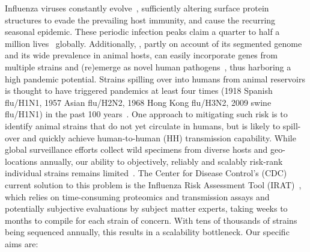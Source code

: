 \documentclass[onecolumn, compsoc,10pt]{IEEEtran}
\begin{document}

  
Influenza viruses constantly evolve~\cite{dos2016influenza}, sufficiently altering surface protein structures to evade the prevailing host immunity, and cause the recurring seasonal  epidemic. These periodic  infection peaks claim a quarter to half a million lives~\cite{huddleston2020integrating} globally. Additionally, \infl, partly on account of its segmented genome and its wide prevalence in animal hosts, can easily incorporate genes from multiple strains and (re)emerge as novel human pathogens~\cite{reid2003origin}, thus harboring  a high pandemic potential. Strains spilling over into humans from animal reservoirs is thought to have triggered  pandemics  at least four times (1918 Spanish flu/H1N1, 1957 Asian flu/H2N2, 1968 Hong Kong flu/H3N2, 2009 swine flu/H1N1) in the past 100 years~\cite{shao2017evolution}. One  approach to mitigating such risk is to identify  animal strains  that do not yet circulate in humans, but is likely to spill-over and quickly achieve human-to-human (HH) transmission capability. While global surveillance efforts collect wild specimens from diverse hosts and geo-locations annually, our  ability to objectively, reliably and scalably  risk-rank individual strains remains limited~\cite{wille2021accurately}. The Center for Disease Control's (CDC) current solution to this problem is the Influenza Risk Assessment Tool (IRAT)~\cite{Influenz24:online}, which relies on time-consuming proteomics and transmission assays and potentially subjective evaluations by subject matter experts, taking  weeks to months to compile for each strain of concern. With tens of   thousands of strains being sequenced annually, this results in  a scalability bottleneck. Our specific aims are:
\end{document}
